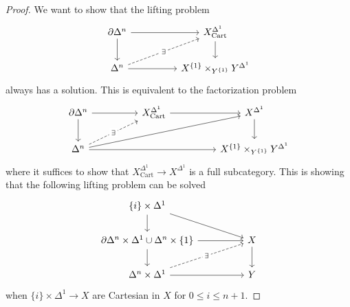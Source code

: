 \begin{proof}
    We want to show that the lifting problem 
    $$%
    \begin{tikzcd}
        {\partial\Delta^{n}} && {X^{\Delta^{1}}_{\mathrm{Cart}}} \\
        {\Delta^{n}} && {X^{\{1\}}\times_{Y^{\{1\}}}Y^{\Delta^{1}}}
        \arrow[from=1-1, to=1-3]
        \arrow[from=1-3, to=2-3]
        \arrow[from=1-1, to=2-1]
        \arrow[from=2-1, to=2-3]
        \arrow["\exists"{description}, dashed, from=2-1, to=1-3]
    \end{tikzcd}$$
    always has a solution. This is equivalent to the factorization problem 
    $$%
    \begin{tikzcd}
        {\partial\Delta^{n}} && {X^{\Delta^{1}}_{\mathrm{Cart}}} && {X^{\Delta^{1}}} \\
        {\Delta^{n}} &&&& {X^{\{1\}}\times_{Y^{\{1\}}}Y^{\Delta^{1}}}
        \arrow[from=1-1, to=1-3]
        \arrow[from=1-3, to=1-5]
        \arrow[from=1-5, to=2-5]
        \arrow[from=2-1, to=2-5]
        \arrow[from=1-1, to=2-1]
        \arrow[from=2-1, to=1-5]
        \arrow["\exists"{description}, dashed, from=2-1, to=1-3]
    \end{tikzcd}$$
    where it suffices to show that $X^{\Delta^{1}}_{\mathrm{Cart}}\to X^{\Delta^{1}}$ is a full subcategory. This is showing that the following lifting problem can be solved 
    $$%
    \begin{tikzcd}
        {\{i\}\times\Delta^{1}} \\
        {\partial\Delta^{n}\times\Delta^{1}\cup\Delta^{n}\times\{1\}} && X \\
        {\Delta^{n}\times\Delta^{1}} && Y
        \arrow[from=1-1, to=2-3]
        \arrow[from=3-1, to=3-3]
        \arrow[from=2-3, to=3-3]
        \arrow[from=2-1, to=2-3]
        \arrow[from=1-1, to=2-1]
        \arrow[from=2-1, to=3-1]
        \arrow["\exists"{description}, dashed, from=3-1, to=2-3]
    \end{tikzcd}$$
    when $\{i\}\times\Delta^{1}\to X$ are Cartesian in $X$ for $0\leq i\leq n+1$. 
\end{proof}